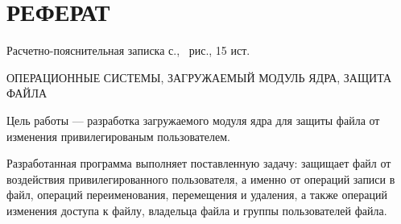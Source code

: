 \section*{\large РЕФЕРАТ}

Расчетно-пояснительная записка \pageref{LastPage} с., \totalfigures\ рис., 15 ист.

ОПЕРАЦИОННЫЕ СИСТЕМЫ, ЗАГРУЖАЕМЫЙ МОДУЛЬ ЯДРА, ЗАЩИТА ФАЙЛА

Цель работы --- разработка загружаемого модуля ядра для защиты файла от изменения привилегированым пользователем.

Разработанная программа выполняет поставленную задачу: защищает файл от воздействия привилегированного пользователя, а именно от операций записи в файл, операций переименования, перемещения и удаления, а также операций изменения доступа к файлу, владельца файла и группы пользователей файла.


\pagebreak